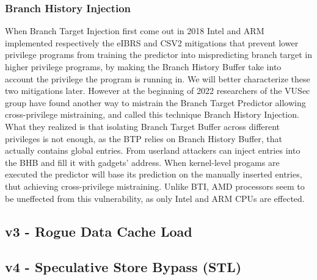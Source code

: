 \subsubsection{Branch History Injection}
When Branch Target Injection first come out in 2018 Intel and ARM implemented respectively the eIBRS and CSV2 mitigations that prevent lower privilege programs from training the predictor into mispredicting branch target in higher privilege programs, by making the Branch History Buffer take into account the privilege the program is running in. 
We will better characterize these two mitigations later.
However at the beginning of 2022 researchers of the VUSec group have found another way to mistrain the Branch Target Predictor allowing cross-privilege mistraining, and called this technique Branch History Injection.
What they realized is that isolating Branch Target Buffer across different privileges is not enough, as the BTP relies on Branch History Buffer, that actually contains global entries.
From userland attackers can inject entries into the BHB and fill it with gadgets' address. When kernel-level progams are executed the predictor will base its prediction on the manually inserted entries, thut achieving cross-privilege mistraining.
Unlike BTI, AMD processors seem to be uneffected from this vulnerability, as only Intel and ARM CPUs are effected.

\subsection{v3 - Rogue Data Cache Load}

\subsection{v4 - Speculative Store Bypass (STL)}

